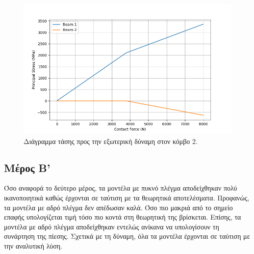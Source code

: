 \documentclass{article}
\begin{document}
\begin{figure}[H]
    \centering
    \includegraphics[width=0.8\linewidth]{media/sF.png}
    \caption{Διάγραμμα τάσης προς την εξωτερική δύναμη στον κόμβο 2.}
    \label{fig:a3}
\end{figure}



\subsection{Μέρος Β'}
Όσο αναφορά το δεύτερο μέρος, τα μοντέλα με πυκνό πλέγμα αποδείχθηκαν πολύ ικανοποιητικά καθώς έρχονται σε ταύτιση με τα θεωρητικά αποτελέσματα. Προφανώς, τα μοντέλα με αδρό πλέγμα δεν απέδωσαν καλά. Όσο πιο μακριά από το σημείο επαφής υπολογίζεται τιμή τόσο πιο κοντά στη θεωρητική της βρίσκεται. Επίσης, τα μοντέλα με αδρό πλέγμα αποδείχθηκαν εντελώς ανίκανα να υπολογίσουν τη συνάρτηση της πίεσης. Σχετικά με τη δύναμη, όλα τα μοντέλα έρχονται σε ταύτιση με την αναλυτική λύση.
\end{document}
